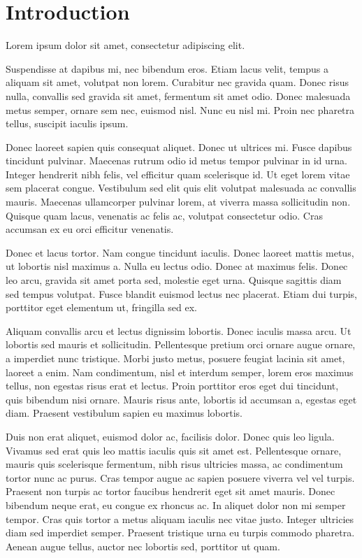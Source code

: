 \section{Introduction}
\label{sec:intro}
Lorem ipsum dolor sit amet, consectetur adipiscing elit.\cite{silverMasteringChessShogi2017}

Suspendisse at dapibus mi, nec bibendum eros. Etiam lacus velit, tempus a aliquam sit amet, volutpat non lorem. Curabitur nec gravida quam. Donec risus nulla, convallis sed gravida sit amet, fermentum sit amet odio. Donec malesuada metus semper, ornare sem nec, euismod nisl. Nunc eu nisl mi. Proin nec pharetra tellus, suscipit iaculis ipsum.

Donec laoreet sapien quis consequat aliquet. Donec ut ultrices mi. Fusce dapibus tincidunt pulvinar. Maecenas rutrum odio id metus tempor pulvinar in id urna. Integer hendrerit nibh felis, vel efficitur quam scelerisque id. Ut eget lorem vitae sem placerat congue. Vestibulum sed elit quis elit volutpat malesuada ac convallis mauris. Maecenas ullamcorper pulvinar lorem, at viverra massa sollicitudin non. Quisque quam lacus, venenatis ac felis ac, volutpat consectetur odio. Cras accumsan ex eu orci efficitur venenatis.

Donec et lacus tortor. Nam congue tincidunt iaculis. Donec laoreet mattis metus, ut lobortis nisl maximus a. Nulla eu lectus odio. Donec at maximus felis. Donec leo arcu, gravida sit amet porta sed, molestie eget urna. Quisque sagittis diam sed tempus volutpat. Fusce blandit euismod lectus nec placerat. Etiam dui turpis, porttitor eget elementum ut, fringilla sed ex.

Aliquam convallis arcu et lectus dignissim lobortis. Donec iaculis massa arcu. Ut lobortis sed mauris et sollicitudin. Pellentesque pretium orci ornare augue ornare, a imperdiet nunc tristique. Morbi justo metus, posuere feugiat lacinia sit amet, laoreet a enim. Nam condimentum, nisl et interdum semper, lorem eros maximus tellus, non egestas risus erat et lectus. Proin porttitor eros eget dui tincidunt, quis bibendum nisi ornare. Mauris risus ante, lobortis id accumsan a, egestas eget diam. Praesent vestibulum sapien eu maximus lobortis.

Duis non erat aliquet, euismod dolor ac, facilisis dolor. Donec quis leo ligula. Vivamus sed erat quis leo mattis iaculis quis sit amet est. Pellentesque ornare, mauris quis scelerisque fermentum, nibh risus ultricies massa, ac condimentum tortor nunc ac purus. Cras tempor augue ac sapien posuere viverra vel vel turpis. Praesent non turpis ac tortor faucibus hendrerit eget sit amet mauris. Donec bibendum neque erat, eu congue ex rhoncus ac. In aliquet dolor non mi semper tempor. Cras quis tortor a metus aliquam iaculis nec vitae justo. Integer ultricies diam sed imperdiet semper. Praesent tristique urna eu turpis commodo pharetra. Aenean augue tellus, auctor nec lobortis sed, porttitor ut quam.
